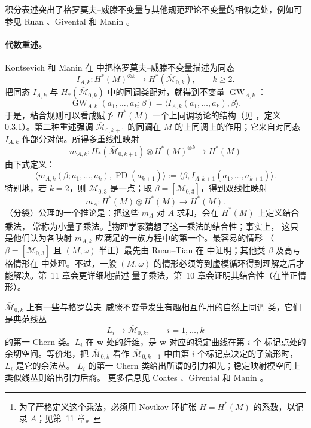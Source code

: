 积分表述突出了格罗莫夫--威滕不变量与其他规范理论不变量的相似之处，例如可参见
Ruan 、Givental  和 Manin 。

\paragraph{代数重述。}
Kontsevich 和 Manin 在  中把格罗莫夫--威滕不变量描述为同态
\[
  I_{A,k}:H^*(M)^{\otimes k}\longrightarrow
  H^*(\overline{\mathcal M}_{0,k}),
  \qquad k\ge2.
\]
把同态 $I_{A,k}$ 与 $H_*(\overline{\mathcal M}_{0,k})$ 中的同调类配对，就得到不变量
$\operatorname{GW}_{A,k}$：
\[
  \operatorname{GW}_{A,k}(a_1,\ldots,a_k;\beta)
  =\bigl\langle I_{A,k}(a_1,\ldots,a_k),\beta\bigr\rangle.
\]
于是，粘合规则可以看成赋予 $H^*(M)$ 一个上同调场论的结构（见
，定义 0.3.1）。第二种重述强调
$\overline{\mathcal M}_{0,k+1}$ 的同调在 $M$ 的上同调上的作用；它来自对同态 $I_{A,k}$
作部分对偶。所得多重线性映射
\[
  m_{A,k}:H_*(\overline{\mathcal M}_{0,k+1})
  \otimes H^*(M)^{\otimes k}\longrightarrow H^*(M)
\]
由下式定义：
\[
  \bigl\langle m_{A,k}(\beta;a_1,\ldots,a_k),
                 \operatorname{PD}(a_{k+1})\bigr\rangle
  :=\bigl\langle\beta,I_{A,k+1}(a_1,\ldots,a_{k+1})\bigr\rangle.
\]
特别地，若 $k=2$，则 $\overline{\mathcal M}_{0,3}$ 是一点；取
$\beta=[\overline{\mathcal M}_{0,3}]$，得到双线性映射
\[
  m_A:H^*(M)\otimes H^*(M)\longrightarrow H^*(M).
\]
（分裂）公理的一个推论是：把这些 $m_A$ 对 $A$ 求和，会在 $H^*(M)$ 上定义结合乘法，
常称为小量子乘法。\footnote{为了严格定义这个乘法，必须用 Novikov 环扩张
$H=H^*(M)$ 的系数，以记录 $A$；见第~11 章。}物理学家猜想了这一乘法的结合性；事实上，
这只是他们认为各映射 $m_{A,k}$ 应满足的一族方程中的第一个。最容易的情形
（$\beta=[\overline{\mathcal M}_{0,3}]$ 且 $(M,\omega)$ 半正）最先由 Ruan--Tian 在
 中证明；其他类 $\beta$ 及高亏格情形在  中处理。不过，一般
$(M,\omega)$ 的情形必须等到虚模循环得到理解之后才能解决。第~11 章会更详细地描述
量子乘法，第~10 章会证明其结合性（在半正情形）。

\begin{remark}\label{rem:7-5-4}
$\overline{\mathcal M}_{0,k}$ 上有一些与格罗莫夫--威滕不变量发生有趣相互作用的自然上同调
类，它们是典范线丛
\[
  L_i\longrightarrow\overline{\mathcal M}_{0,k},
  \qquad i=1,\ldots,k
\]
的第一 Chern 类。$L_i$ 在 $\mathbf w$ 处的纤维，是 $\mathbf w$ 对应的稳定曲线在第 $i$ 个
标记点处的余切空间。等价地，把 $\overline{\mathcal M}_{0,k}$ 看作
$\overline{\mathcal M}_{0,k+1}$ 中由第 $i$ 个标记点决定的子流形时，$L_i$ 是它的余法丛。
$L_i$ 的第一 Chern 类给出所谓的引力祖先；稳定映射模空间上类似线丛则给出引力后裔。
更多信息见 Coates 、Givental  和 Manin 。
\end{remark}

